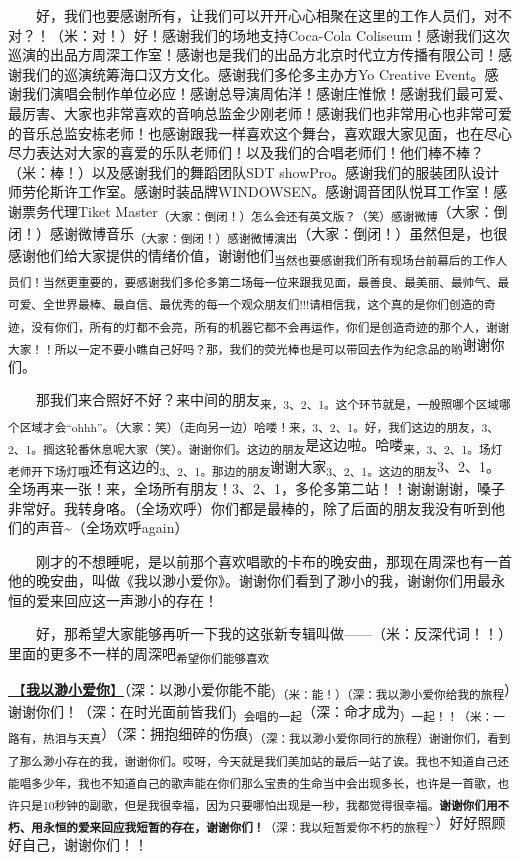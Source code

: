 \documentclass[]{ctexbook}
\begin{document}
  好，我们也要感谢所有，让我们可以开开心心相聚在这里的工作人员们，对不对？！（米：对！）好！感谢我们的场地支持Coca-Cola Coliseum！感谢我们这次巡演的出品方周深工作室！感谢也是我们的出品方北京时代立方传播有限公司！感谢我们的巡演统筹海口汉方文化。感谢我们多伦多主办方Yo Creative Event。感谢我们演唱会制作单位必应！感谢总导演周佑洋！感谢庄惟惞！感谢我们最可爱、最厉害、大家也非常喜欢的音响总监金少刚老师！感谢我们也非常用心也非常可爱的音乐总监安栋老师！也感谢跟我一样喜欢这个舞台，喜欢跟大家见面，也在尽心尽力表达对大家的喜爱的乐队老师们！以及我们的合唱老师们！他们棒不棒？（米：棒！）以及感谢我们的舞蹈团队SDT showPro。感谢我们的服装团队设计师劳伦斯许工作室。感谢时装品牌WINDOWSEN。感谢调音团队悦耳工作室！感谢票务代理Tiket Master\textsubscript{（大家：倒闭！）怎么会还有英文版？（笑）感谢微博}（大家：倒闭！）感谢微博音乐\textsubscript{（大家：倒闭！）感谢微博演出}（大家：倒闭！）虽然但是，也很感谢他们给大家提供的情绪价值，谢谢他们\textsubscript{当然也要感谢我们所有现场台前幕后的工作人员们！当然更重要的，要感谢我们多伦多第二场每一位来跟我见面，最善良、最美丽、最帅气、最可爱、全世界最棒、最自信、最优秀的每一个观众朋友们!!!请相信我，这个真的是你们创造的奇迹，没有你们，所有的灯都不会亮，所有的机器它都不会再运作，你们是创造奇迹的那个人，谢谢大家！！所以一定不要小瞧自己好吗？那，我们的荧光棒也是可以带回去作为纪念品的哟}谢谢你们。

  那我们来合照好不好？来中间的朋友\textsubscript{来，3、2、1。这个环节就是，一般照哪个区域哪个区域才会``ohhh''。（大家：笑）（走向另一边）哈喽！来，3、2、1。好，我们这边的朋友，3、2、1。搁这轮番休息呢大家（笑）。谢谢你们。这边的朋友}是这边啦。哈喽\textsubscript{来，3、2、1。场灯老师开下场灯哦}还有这边的\textsubscript{3、2、1。那边的朋友}谢谢大家\textsubscript{3、2、1。这边的朋友}3、2、1。全场再来一张！来，全场所有朋友！3、2、1，多伦多第二站！！谢谢谢谢，嗓子非常好。我转身咯。（全场欢呼）你们都是最棒的，除了后面的朋友我没有听到他们的声音\textasciitilde（全场欢呼again）

  刚才的不想睡呢，是以前那个喜欢唱歌的卡布的晚安曲，那现在周深也有一首他的晚安曲，叫做《我以渺小爱你》。谢谢你们看到了渺小的我，谢谢你们用最永恒的爱来回应这一声渺小的存在！

  好，那希望大家能够再听一下我的这张新专辑叫做------（米：反深代词！！）里面的更多不一样的周深吧\textsubscript{希望你们能够喜欢}

\hyperref[loving-you-in-my-humble-way]{🎵【\textbf{我以渺小爱你}】}（深：以渺小爱你能不能\textsubscript{）（米：能！）（深：我以渺小爱你给我的旅程}）谢谢你们！（深：在时光面前皆我们\textsubscript{）会唱的一起}（深：命才成为\textsubscript{）一起！！（米：一路有，热泪与天真}）（深：拥抱细碎的伤痕\textsubscript{）（深：我以渺小爱你同行的旅程）谢谢你们，看到了那么渺小存在的我，谢谢你们。哎呀，今天就是我们美加站的最后一站了诶。我也不知道自己还能唱多少年，我也不知道自己的歌声能在你们那么宝贵的生命当中会出现多长，也许是一首歌，也许只是10秒钟的副歌，但是我很幸福，因为只要哪怕出现是一秒，我都觉得很幸福。\textbf{谢谢你们用不朽、用永恒的爱来回应我短暂的存在，谢谢你们！}（深：我以短暂爱你不朽的旅程}\textasciitilde）好好照顾好自己，谢谢你们！！
\end{document}
